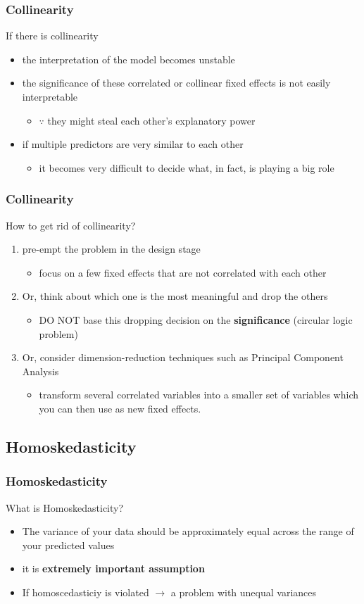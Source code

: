 \documentclass{beamer}\usepackage[]{graphicx}\usepackage[]{color}
\begin{document}
\begin{frame}
\frametitle{Collinearity}
If there is collinearity
\begin{itemize}
\item the interpretation of the model becomes \alert{unstable}
\item the significance of these correlated or collinear fixed effects is not easily interpretable
\begin{itemize}
\item $\because$ they might steal each other's \alert{explanatory power}
\end{itemize}
\item if multiple predictors are very similar to each other
	\begin{itemize}
	\item it becomes very difficult to decide what, in fact, is playing a big role
	\end{itemize}
\end{itemize}
\end{frame}

\begin{frame}
\frametitle{Collinearity}
How to get rid of collinearity?
\begin{enumerate}
\item pre-empt the problem in the design stage
	\begin{itemize}
	\item focus on a few fixed effects that are not correlated with each other
	\end{itemize}
\item Or, think about which one is the most meaningful and drop the others
	\begin{itemize}
	\item DO NOT base this dropping decision on the \textbf{significance} (circular logic problem)
	\end{itemize}
\item Or, consider dimension-reduction techniques such as Principal Component Analysis
	\begin{itemize}
	\item transform several correlated variables into a smaller set of variables which you can then use as new fixed effects.
	\end{itemize}
\end{enumerate}
\end{frame}

\subsection{Homoskedasticity}
\begin{frame}
\frametitle{Homoskedasticity}
What is Homoskedasticity?
\begin{itemize}
\item The variance of your data should be approximately equal across the range of your predicted values
\item it is \textbf{extremely important assumption}
\item If homoscedasticiy is violated $\rightarrow$ a problem with unequal variances
\end{itemize}
\end{frame}
\end{document}
